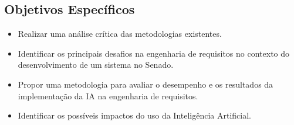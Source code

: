 \subsection{Objetivos Específicos}

\begin{itemize}
	\item Realizar uma análise crítica das metodologias existentes.
	\item Identificar os principais desafios na engenharia de requisitos no contexto do desenvolvimento de um sistema no Senado.
	\item Propor uma metodologia para avaliar o desempenho e os resultados da implementação da IA na engenharia de requisitos.
	\item Identificar os possíveis impactos do uso da Inteligência Artificial.
\end{itemize}


